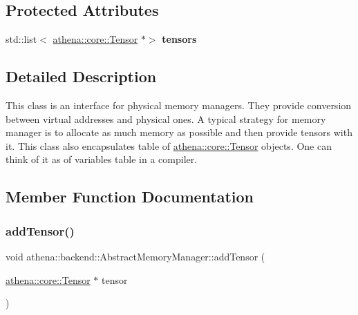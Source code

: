 \subsection*{Protected Attributes}
\begin{DoxyCompactItemize}
\item 
\mbox{\label{classathena_1_1backend_1_1_abstract_memory_manager_a95e7f8064dea9c79d8e88d39affafda7}} 
std\+::list$<$ \mbox{\hyperlink{classathena_1_1core_1_1_tensor}{athena\+::core\+::\+Tensor}} $\ast$$>$ {\bfseries tensors}
\end{DoxyCompactItemize}


\subsection{Detailed Description}
This class is an interface for physical memory managers. They provide conversion between virtual addresses and physical ones. A typical strategy for memory manager is to allocate as much memory as possible and then provide tensors with it. This class also encapsulates table of \mbox{\hyperlink{classathena_1_1core_1_1_tensor}{athena\+::core\+::\+Tensor}} objects. One can think of it as of variables table in a compiler. 

\subsection{Member Function Documentation}
\mbox{\label{classathena_1_1backend_1_1_abstract_memory_manager_adaa80b617f6f3f19ba5b1ddd2b0377e7}} 
\subsubsection{\texorpdfstring{add\+Tensor()}{addTensor()}}
{\footnotesize\ttfamily void athena\+::backend\+::\+Abstract\+Memory\+Manager\+::add\+Tensor (\begin{DoxyParamCaption}\item[{\mbox{\hyperlink{classathena_1_1core_1_1_tensor}{athena\+::core\+::\+Tensor}} $\ast$}]{tensor }\end{DoxyParamCaption})}


